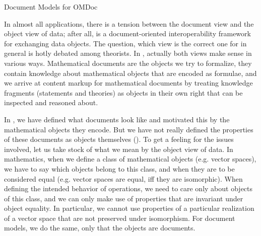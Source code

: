 
\begin{module}[id=document-model]
\begin{omgroup}[id=document-model]{Document Models for OMDoc}

In almost all {\xml} applications, there is a tension between the document view and the
object view of data; after all, {\xml} is a document-oriented interoperability framework
for exchanging data objects. The question, which view is the correct one for {\xml} in
general is hotly debated among {\xml} theorists. In \omdoc, actually both views make
sense in various ways. Mathematical documents are the objects we try to formalize, they
contain knowledge about mathematical objects that are encoded as formulae, and we arrive
at content markup for mathematical documents by treating knowledge fragments (statements
and theories) as objects in their own right that can be inspected and reasoned about.

\begin{omtext}
  In {}, we have defined what \omdoc documents look like and motivated
  this by the mathematical objects they encode. But we have not really defined the
  properties of these documents as objects themselves (). To get a feeling
  for the issues involved, let us take stock of what we mean by the object view of
  data. In mathematics, when we define a class of mathematical objects (e.g.  vector
  spaces), we have to say which objects belong to this class, and when they are to be
  considered equal (e.g.  vector spaces are equal, iff they are isomorphic). When defining
  the intended behavior of operations, we need to care only about objects of this class,
  and we can only make use of properties that are invariant under object equality. In
  particular, we cannot use properties of a particular realization of a vector space that
  are not preserved under isomorphism. For document models, we do the same, only that the
  objects are documents.
\end{omtext}


\end{omgroup}
\end{module}
